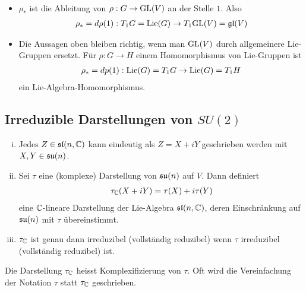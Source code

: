 \begin{bemerkung}
    \begin{itemize}
        \item $\rho_\ast$ ist die Ableitung von $\rho: G \rightarrow \text{GL}(V)$
            an der Stelle $1$. Also
            \begin{align*}
                \rho_\ast = d \rho(1) : T_1 G = \text{Lie}(G) \rightarrow T_1 \text{GL}(V) = \mathfrak{gl}(V)
            \end{align*}
        \item Die Aussagen oben bleiben richtig, wenn man $\text{GL}(V)$ durch allgemeinere
            Lie-Gruppen ersetzt. Für $\rho: G \rightarrow H$ einem Homomorphismus
            von Lie-Gruppen ist
            \begin{align*}
                \rho_\ast = dp(1) : \text{Lie}(G) = T_1 G \rightarrow \text{Lie}(G) = T_1 H
            \end{align*}
            ein Lie-Algebra-Homomorphismus.
    \end{itemize}
\end{bemerkung}

\subsection{Irreduzible Darstellungen von $SU(2)$}

\begin{lemma}
    \begin{enumerate}[(i)]
        \item Jedes $Z \in \mathfrak{sl}(n,\mathbb{C})$ kann eindeutig als $Z=X+iY$
            geschrieben werden mit $X,Y \in \mathfrak{su}(n)$.
        \item Sei $\tau$ eine (komplexe) Darstellung von $\mathfrak{su}(n)$ auf $V$.
            Dann definiert
            \begin{align*}
                \tau_{\mathbb{C}} (X+iY) = \tau(X) + i \tau(Y)
            \end{align*}
            eine $\mathbb{C}$-lineare Darstellung der Lie-Algebra $\mathfrak{sl}(n,\mathbb{C})$, deren
            Einschränkung auf $\mathfrak{su}(n)$ mit $\tau$ übereinstimmt.
        \item $\tau_{\mathbb{C}}$ ist genau dann irreduzibel (vollständig reduzibel)
            wenn $\tau$ irreduzibel (vollständig reduzibel) ist.
    \end{enumerate}
    Die Darstellung $\tau_{\mathbb{C}}$ heisst Komplexifizierung von $\tau$. Oft
    wird die Vereinfachung der Notation $\tau$ statt $\tau_{\mathbb{C}}$ geschrieben.
\end{lemma}

